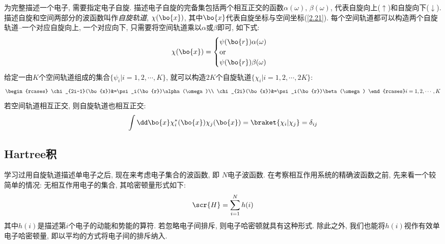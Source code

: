 为完整描述一个电子, 
需要指定电子自旋. 
描述电子自旋的完备集包括两个相互正交的函数$\alpha(\omega),\,\beta(\omega)$, 
代表自旋向上($\uparrow$)和自旋向下($\downarrow$). 
描述自旋和空间两部分的波函数叫作\emph{自旋轨道},
$\chi(\bo{x})$,
其中$\bo{x}$代表自旋坐标与空间坐标(\autoref{2.21}). 
每个空间轨道都可以构造两个自旋轨道--一个对应自旋向上,
一个对应向下, 
只需要将空间轨道乘以$\alpha$或$\beta$即可, 
如下式:
\begin{equation}
	\chi(\bo{x})=
	\begin{cases}
	\psi(\bo{r})\alpha(\omega)\\
	\text{or}\\
	\psi(\bo{r})\beta(\omega)
	\end{cases}
\end{equation}
给定一由$K$个空间轨道组成的集合$\{\psi_i|i=1,2,\cdots,K \}$, 
就可以构造$2K$个自旋轨道$\{\chi_i|i=1,2,\cdots, 2K\}$:
\begin{equation}
\begin{rcases}
	\chi_{2i-1}(\bo{x})&=\psi_i(\bo{r})\alpha(\omega)\\
	\chi_{2i}(\bo{x})&=\psi_i(\bo{r})\beta(\omega)
\end{rcases}
i=1,2,\cdots,K
\end{equation}
若空间轨道相互正交, 
则自旋轨道也相互正交:
\begin{equation}
\int\dd\bo{x}\chi_i^*(\bo{x})\chi_j(\bo{x})=\braket{\chi_i|\chi_j}=\delta_{ij}
\end{equation}
\subsection{Hartree积}
 \label{sec2.2.2}
学习过用自旋轨道描述单电子之后, 
现在来考虑电子集合的波函数, 
即 $N$电子波函数. 
在考察相互作用系统的精确波函数之前, 
先来看一个较简单的情况: 无相互作用电子的集合, 
其哈密顿量形式如下:
\begin{equation}
\label{2.28}
\scr{H}=\sum_{i=1}^{N}h(i)
\end{equation}
其中$h(i)$是描述第$i$个电子的动能和势能的算符. 
若忽略电子间排斥, 
则电子哈密顿就具有这种形式. 
除此之外, 
我们也能将$h(i)$视作有效单电子哈密顿量, 
即以平均的方式将电子间的排斥纳入.


